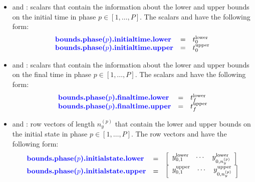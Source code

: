 \documentclass[10pt]{article}
\newcommand{\bfblue}[1]{\textrm{{\color{blue}{\bf #1}}}}
\begin{document}
\begin{itemize}
\item \bfblue{bounds.phase($p$).initialtime.lower} and
  \bfblue{bounds.phase($p$).initialtime.upper}: scalars that contain the
  information about the lower and upper bounds on the initial time in
  phase $p\in[1,\ldots,P]$.  The scalars
  \bfblue{bounds.phase($p$).initialtime.lower} and
  \bfblue{bounds.phase($p$).initialtime.upper} have the following form: 
 \begin{displaymath}
   \begin{array}{lcl}
     \bfblue{bounds.phase($p$).initialtime.lower} & = &  t_0^{\textrm{lower}} \\
     \bfblue{bounds.phase($p$).initialtime.upper} & = &  t_0^{\textrm{upper}}
  \end{array}
 \end{displaymath}
\item \bfblue{bounds.phase($p$).finaltime.lower} and \bfblue{bounds($p$).finaltime.upper}:
 scalars that contain the information about the lower and upper
 bounds on the final time in phase $p\in[1,\ldots,P]$.  The
 scalars \bfblue{bounds.phase($p$).finaltime.lower} and \bfblue{bounds.phase($p$).finaltime.upper}
 have the following form:
 \begin{displaymath}
   \begin{array}{lcl}
     \bfblue{bounds.phase($p$).finaltime.lower} & = &  t_f^{\textrm{lower}} \\
     \bfblue{bounds.phase($p$).finaltime.upper} & = &  t_f^{\textrm{upper}}
  \end{array}
 \end{displaymath}
\item \bfblue{bounds.phase($p$).initialstate.lower} and
  \bfblue{bounds.phase($p$).initialstate.upper}: 
row vectors of length $n_y^{(p)}$ that contain the lower and upper
bounds on the initial state in phase $p\in[1,\ldots,P]$.  The row
vectors \bfblue{bounds.phase($p$).initialstate.lower} and
\bfblue{bounds.phase($p$).initialstate.upper} have the following form:
\begin{displaymath}
 \begin{array}{lcl}
   \bfblue{bounds.phase($p$).initialstate.lower} & = &
  \left[\begin{array}{ccc} y_{0,1}^{\textrm{lower}} & \cdots & y_{0,n_y^{(p)}}^{\textrm{lower}}\end{array}\right] \\
   \bfblue{bounds.phase($p$).initialstate.upper} & = &
  \left[\begin{array}{ccc} y_{0,1}^{\textrm{upper}} & \cdots & y_{0,n_y^{(p)}}^{\textrm{upper}}\end{array}\right]

\end{array}
\end{displaymath}
\end{itemize}
\end{document}
